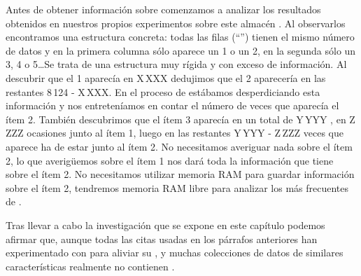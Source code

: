 Antes de obtener información sobre \mushroom comenzamos a analizar los resultados obtenidos en nuestros propios experimentos sobre este almacén \D. Al observarlos encontramos una estructura concreta: todas las filas ("`\transacciones"') tienen el mismo número de datos y en la primera columna sólo aparece un 1 o un 2, en la segunda sólo un 3, 4 o 5\ldots Se trata de una estructura muy rígida y con exceso de información. Al descubrir que el 1 aparecía en X\,XXX \transacciones dedujimos que el 2 aparecería en las restantes 8\,124 - X\,XXX. En el proceso de \fim estábamos desperdiciando esta información y nos entreteníamos en contar el número de veces que aparecía el ítem 2. También descubrimos que el ítem 3 aparecía en un total de Y\,YYY \transacciones, en Z\,ZZZ ocasiones junto al ítem 1, luego en las restantes Y\,YYY - Z\,ZZZ veces que aparece ha de estar junto al ítem 2. No necesitamos averiguar nada sobre el ítem 2, lo que averigüemos sobre el ítem 1 nos dará toda la información que tiene \D sobre el ítem 2. No necesitamos utilizar memoria RAM para guardar información sobre el ítem 2, tendremos memoria RAM libre para analizar los \irs más frecuentes de \D.

Tras llevar a cabo la investigación que se expone en este capítulo podemos afirmar que, aunque todas las citas usadas en los párrafos anteriores han experimentado con \mushroom para aliviar su \dilemaIR, \mushroom y muchas colecciones de datos de similares características realmente no contienen \IRs.





